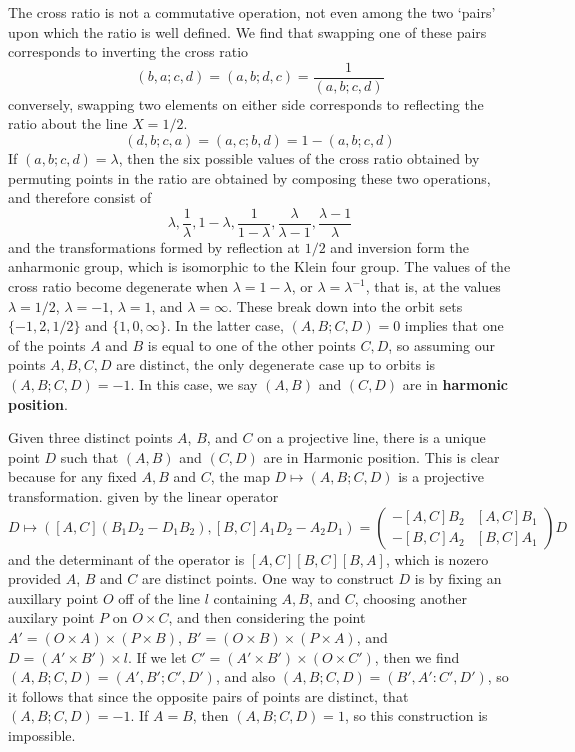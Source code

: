 The cross ratio is not a commutative operation, not even among the two `pairs' upon which the ratio is well defined. We find that swapping one of these pairs corresponds to inverting the cross ratio
%
\[ (b,a;c,d) = (a,b;d,c) = \frac{1}{(a,b;c,d)} \]
%
conversely, swapping two elements on either side corresponds to reflecting the ratio about the line $X = 1/2$.
%
\[ (d,b;c,a) = (a,c;b,d) = 1 - (a,b;c,d) \]
%
If $(a,b;c,d) = \lambda$, then the six possible values of the cross ratio obtained by permuting points in the ratio are obtained by composing these two operations, and therefore consist of
%
\[ \lambda, \frac{1}{\lambda}, 1 - \lambda, \frac{1}{1 - \lambda}, \frac{\lambda}{\lambda - 1}, \frac{\lambda - 1}{\lambda} \]
%
and the transformations formed by reflection at $1/2$ and inversion form the anharmonic group, which is isomorphic to the Klein four group. The values of the cross ratio become degenerate when $\lambda = 1 - \lambda$, or $\lambda = \lambda^{-1}$, that is, at the values $\lambda = 1/2$, $\lambda = -1$, $\lambda = 1$, and $\lambda = \infty$. These break down into the orbit sets $\{ -1, 2, 1/2 \}$ and $\{ 1, 0, \infty \}$. In the latter case, $(A,B;C,D) = 0$ implies that one of the points $A$ and $B$ is equal to one of the other points $C,D$, so assuming our points $A,B,C,D$ are distinct, the only degenerate case up to orbits is $(A,B;C,D) = -1$. In this case, we say $(A,B)$ and $(C,D)$ are in {\bf harmonic position}.

Given three distinct points $A$, $B$, and $C$ on a projective line, there is a unique point $D$ such that $(A,B)$ and $(C,D)$ are in Harmonic position. This is clear because for any fixed $A,B$ and $C$, the map $D \mapsto (A,B;C,D)$ is a projective transformation. given by the linear operator
%
\[ D \mapsto ([A,C](B_1D_2 - D_1B_2), [B,C] A_1D_2 - A_2D_1) = \begin{pmatrix} -[A,C]B_2 & [A,C]B_1 \\ -[B,C]A_2 & [B,C]A_1 \end{pmatrix} D \]
%
and the determinant of the operator is $[A,C][B,C][B,A]$, which is nozero provided $A$, $B$ and $C$ are distinct points. One way to construct $D$ is by fixing an auxillary point $O$ off of the line $l$ containing $A,B$, and $C$, choosing another auxilary point $P$ on $O \times C$, and then considering the point $A' = (O \times A) \times (P \times B)$, $B' = (O \times B) \times (P \times A)$, and $D = (A' \times B') \times l$. If we let $C' = (A' \times B') \times (O \times C')$, then we find $(A,B;C,D) = (A',B';C',D')$, and also $(A,B;C,D) = (B',A':C',D')$, so it follows that since the opposite pairs of points are distinct, that $(A,B;C,D) = -1$. If $A = B$, then $(A,B;C,D) = 1$, so this construction is impossible.

